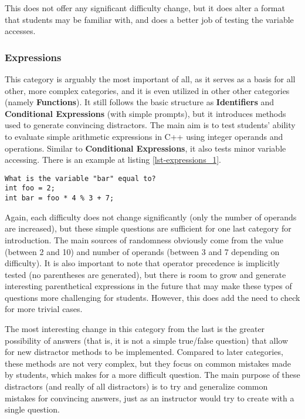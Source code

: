 \documentclass{article}
\begin{document}
This does not offer any significant difficulty change, but it does alter a format that students may be familiar with, and does a better job of testing the variable accesses.

\subsubsection{Expressions} \label{subsubsec-expressions}
This category is arguably the most important of all, as it serves as a basis for all other, more complex categories, and it is even utilized in other other categories
(namely \textbf{Functions}). It still follows the basic structure as \textbf{Identifiers} and \textbf{Conditional Expressions} (with simple prompts), but it introduces methods used to generate convincing distractors.
The main aim is to test students' ability to evaluate simple arithmetic expressions in C++ using integer operands and operations. Similar to \textbf{Conditional Expressions}, it also
tests minor variable accessing. There is an example at listing \ref{lst-expressions_1}.

\begin{lstlisting}[caption={Expressions Question}, label=lst-expressions_1]
What is the variable "bar" equal to? 
int foo = 2; 
int bar = foo * 4 % 3 + 7; 
\end{lstlisting}


Again, each difficulty does not change significantly (only the number of operands are increased), but these simple questions are sufficient for one last category for introduction.
The main sources of randomness obviously come from the value (between 2 and 10) and number of operands (between 3 and 7 depending on difficulty). It is also important to note that
operator precedence is implicitly tested (no parentheses are generated), but there is room to grow and generate interesting parenthetical expressions in the future that may make
these types of questions more challenging for students. However, this does add the need to check for more trivial cases. 

The most interesting change in this category from the last is the greater possibility of answers (that is, it is not a simple true/false question) that allow for new distractor methods to be implemented. Compared to later categories, these methods are not very complex, but they focus on common mistakes made by students, which makes for a more difficult question. The main
purpose of these distractors (and really of all distractors) is to try and generalize common mistakes for convincing answers, just as an instructor would try to create with a single question. 
\end{document}
